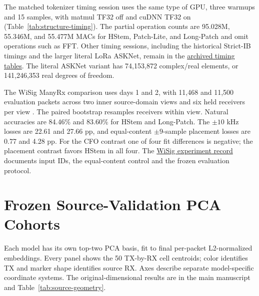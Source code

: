 \documentclass[journal]{IEEEtran}
\begin{document}
\begin{table}[!t]\centering
\caption{Separate matched tokenizer timing. Batch latencies are p50/p95 in ms.}
\label{tab:structure-timing}
\setlength{\tabcolsep}{2.5pt}

\end{table}

The matched tokenizer timing session uses the same type of GPU, three warmups and 15 samples, with matmul TF32 off and cuDNN TF32 on (Table~\ref{tab:structure-timing}). The partial operation counts are 95.028M, 55.346M, and 55.477M MACs for HStem, Patch-Lite, and Long-Patch and omit operations such as FFT. Other timing sessions, including the historical Strict-IB timings and the larger literal LoRa ASKNet, remain in the \href{https://github.com/hanCChan/crossatten/tree/bd671cd/publication/tifs_hstem/tables}{archived timing tables}. The literal ASKNet variant has 74,153,872 complex/real elements, or 141,246,353 real degrees of freedom.

The WiSig ManyRx comparison uses days 1 and 2, with 11,468 and 11,500 evaluation packets across two inner source-domain views and six held receivers per view \cite{hanna2022wisig}. The paired bootstrap resamples receivers within view. Natural accuracies are 84.46\% and 83.60\% for HStem and Long-Patch. The \(\pm10\) kHz losses are 22.61 and 27.66 pp, and equal-content \(\pm9\)-sample placement losses are 0.77 and 4.28 pp. For the CFO contrast one of four fit differences is negative; the placement contrast favors HStem in all four. The \href{https://github.com/hanCChan/crossatten/tree/b170624/research/s29_wisig}{WiSig experiment record} documents input IDs, the equal-content control and the frozen evaluation protocol.




\clearpage
\onecolumn
\section{Frozen Source-Validation PCA Cohorts}
Each model has its own top-two PCA basis, fit to final per-packet L2-normalized embeddings. Every panel shows the 50 TX-by-RX cell centroids; color identifies TX and marker shape identifies source RX. Axes describe separate model-specific coordinate systems. The original-dimensional results are in the main manuscript and Table~\ref{tab:source-geometry}.
\end{document}
